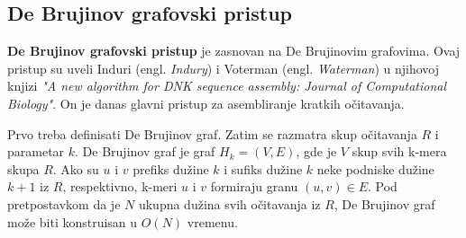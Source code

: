 \documentclass[12pt,oneside]{memoir}
\begin{document}
\begin{comment}
Da bismo rešili prvi problem, biramo očitavanje za šablon, ako je malo verovatno da ono sadrži grešku sekvenciranja ili ako je malo verovatno da će biti u ponovljenom regionu. Koristeći ideju u sekciji 5.3.1, broje se frekvencije svih k-mera svih očitavanja. Očitavanje R se bira za šablon, ako su frekvencije svih njegovih k-mera unutar nekih korisnički definisanih pragova $\theta_{min}$ i $\theta_{max}$. Ako je broj pojavljivanja nekog k-mera manji od $\theta_{min}$, R će verovatno sadržati grešku sekvenciranja. Ako je broj pojavljivanja nekog k-mera veći od $\theta_{max}$, R će se verovatno naći u ponovljenom regionu. Ova dva praga mogu biti određena proučavanjem histograma frekvencija svih k-mera ulaznih sekvenci očitavanja.

Za drugi problem, rešenje je korišćenje informacija o povezivanju paired-end očitavanja za rešavanje nasumičnosti. Ovaj pristup je korišćen od strane $PE-asemblera [9]$. Figura 5.14 ilustruje tu ideju. Pretpostavimo da možemo proširiti šablon koristeći 2 različita očitavanja (crno i sivo). Ne možemo odlučiti koje je ispravo (pogledati Figuru 5.14(a)). Kako svako očitavanje ima svog para, možemo biti u stanju da donesemo odluku. Postoje 2 slučaja. U prvom slučaju, ako parnjak crnom očitavanju može biti poravnat sa šablonom, možemo verovati crnom očitavanju (Figura 5.14(b)). U drugom slučaju, pretpostavimo  da postoji nekoliko očitavanja R koja su poravnata sa šablonom i parnjaci od R mogu biti poravnati sa panjakom crnog očitavanja (pogledati Figuru 5.14(c)). Onda možemo verovati i crnom očitavanju. Drugim rečima, informacije o povezanosti paired-end očitavanja mogu pomoći u  filtriranju onih lažno pozitivnih poravnanja.
\end{comment}

\subsection{De Brujinov grafovski pristup}

\textbf{De Brujinov grafovski pristup} je zasnovan na De Brujinovim grafovima. Ovaj pristup su uveli Induri (engl. \textit{Indury}) i Voterman (engl. \textit{Waterman}) u njihovoj knjizi \textit{"A new algorithm for DNK sequence assembly: Journal of Computational Biology"}. On je danas glavni pristup za asembliranje kratkih očitavanja.

Prvo treba definisati De Brujinov graf. Zatim se razmatra skup očitavanja $R$ i parametar $k$. De Brujinov graf je graf $H_k = (V, E)$, gde je $V$ skup svih k-mera skupa $R$. Ako su $u$ i $v$ prefiks dužine $k$ i sufiks dužine $k$ neke podniske dužine $k + 1$ iz $R$, respektivno, k-meri $u$ i $v$ formiraju granu $(u, v) \in E$. Pod pretpostavkom da je $N$ ukupna dužina svih očitavanja iz $R$, De Brujinov graf može biti konstruisan u $O(N)$ vremenu.
\end{document}
